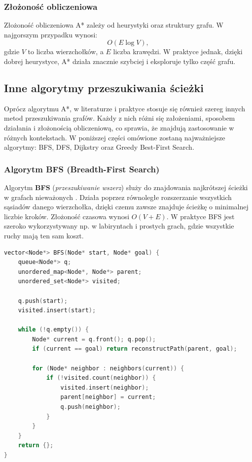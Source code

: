 \documentclass[a4paper,12pt]{book} %
\begin{document}
\subsubsection*{Złożoność obliczeniowa}

Złożoność obliczeniowa A* zależy od heurystyki oraz struktury grafu.  
W najgorszym przypadku wynosi:
\[
O(E \log V),
\]
gdzie $V$ to liczba wierzchołków, a $E$ liczba krawędzi.  
W praktyce jednak, dzięki dobrej heurystyce, A* działa znacznie szybciej i eksploruje tylko część grafu.

\subsection{Inne algorytmy przeszukiwania ścieżki}

Oprócz algorytmu A*, w literaturze i praktyce stosuje się również szereg innych metod przeszukiwania grafów. 
Każdy z nich różni się założeniami, sposobem działania i złożonością obliczeniową, co sprawia, że znajdują zastosowanie w różnych kontekstach.
W poniższej części omówione zostaną najważniejsze algorytmy: BFS, DFS, Dijkstry oraz Greedy Best-First Search.

\subsubsection*{Algorytm BFS (Breadth-First Search)}
Algorytm \textbf{BFS} (\textit{przeszukiwanie wszerz}) służy do znajdowania najkrótszej ścieżki w grafach nieważonych \cite{Algorithms_introduction}. 
Działa poprzez równoległe rozszerzanie wszystkich sąsiadów danego wierzchołka, dzięki czemu zawsze znajduje ścieżkę o minimalnej liczbie kroków. Złożoność czasowa wynosi \(O(V + E)\).
W praktyce BFS jest szeroko wykorzystywany np. w labiryntach i prostych grach, gdzie wszystkie ruchy mają ten sam koszt. 

\begin{lstlisting}[language=C++, caption={Przykład algorytmu BFS}, label={lst:bfs}]
vector<Node*> BFS(Node* start, Node* goal) {
    queue<Node*> q;
    unordered_map<Node*, Node*> parent;
    unordered_set<Node*> visited;

    q.push(start);
    visited.insert(start);

    while (!q.empty()) {
        Node* current = q.front(); q.pop();
        if (current == goal) return reconstructPath(parent, goal);

        for (Node* neighbor : neighbors(current)) {
            if (!visited.count(neighbor)) {
                visited.insert(neighbor);
                parent[neighbor] = current;
                q.push(neighbor);
            }
        }
    }
    return {};
}
\end{lstlisting}
\end{document}
